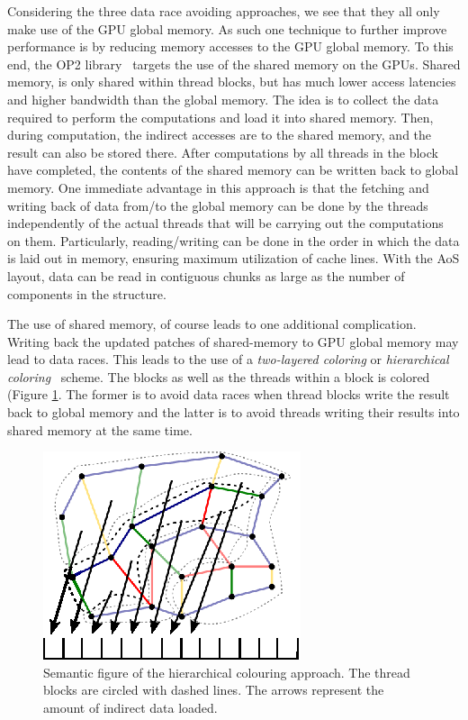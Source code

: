 Considering the three data race avoiding approaches, we see that they all only 
make use of the GPU global memory. As such one technique to further improve 
performance is by reducing memory accesses to the GPU global memory. To this 
end, the OP2 library~\cite{op2} targets the use of the shared memory on the 
GPUs. Shared memory, is only shared within thread blocks, but has much lower 
access latencies and higher bandwidth than the global memory. The idea is to 
collect the data required to perform the computations and load it into shared 
memory. Then, during computation, the indirect accesses are to the shared
memory, and the result can also be stored there. After computations by all 
threads in the block have completed, the contents of the shared memory can be 
written back to global memory. One immediate advantage in this approach is that 
the fetching and writing back of data from/to the global memory can be done by 
the threads independently of the actual threads that will be carrying out the 
computations on them. Particularly, reading/writing can be done in the order 
in which the data is laid out in memory, ensuring maximum utilization of 
cache lines. With the AoS layout, data can be read in contiguous chunks as 
large as the number of components in the structure.

The use of shared memory, of course leads to one additional complication. 
Writing back the updated patches of shared-memory to GPU global memory may lead 
to data races. This leads to the use of a \emph{two-layered coloring} or 
\emph{hierarchical coloring}~\cite{op2} scheme. The blocks as well as the 
threads within a block is colored (Figure \ref{fig:unstructured_hier}. The 
former is to avoid data races when thread blocks write the result back to 
global memory and the latter is to avoid threads writing their results into 
shared memory at the same time. 

\begin{figure}[Htpb]
  \centering
  \includegraphics{fig/svg/unstructured_hier.eps}
  \caption{Semantic figure of the hierarchical colouring approach. The thread
  blocks are circled with dashed lines. The arrows represent the amount of
  indirect data loaded.}
  \label{fig:unstructured_hier}
\end{figure}

